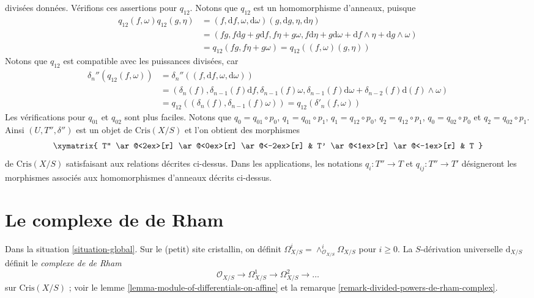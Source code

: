 \begin{remark}
divisées données. Vérifions ces assertions pour $q_{12}$. Notons
que $q_{12}$ est un homomorphisme d'anneaux, puisque
\begin{align*}
q_{12}(f, \omega)q_{12}(g, \eta) & =
(f, \text{d}f, \omega, \text{d}\omega)(g, \text{d}g, \eta, \text{d}\eta) \\
& =
(fg, f\text{d}g + g \text{d}f, f\eta + g\omega,
f\text{d}\eta + g\text{d}\omega + \text{d}f \wedge \eta +
\text{d}g \wedge \omega) \\
& = q_{12}(fg, f\eta + g\omega) = q_{12}((f, \omega)(g, \eta))
\end{align*}
Notons que $q_{12}$ est compatible avec les puissances divisées, car
\begin{align*}
\delta_n''(q_{12}(f, \omega)) & =
\delta_n''((f, \text{d}f, \omega, \text{d}\omega)) \\
& =
(\delta_n(f), \delta_{n - 1}(f)\text{d}f, \delta_{n - 1}(f)\omega,
\delta_{n - 1}(f)\text{d}\omega + \delta_{n - 2}(f)\text{d}(f) \wedge \omega)
\\
& = q_{12}((\delta_n(f), \delta_{n - 1}(f)\omega)) =
q_{12}(\delta'_n(f, \omega))
\end{align*}
Les vérifications pour $q_{01}$ et $q_{02}$ sont plus faciles.
Notons que $q_0 = q_{01} \circ p_0$, $q_1 = q_{01} \circ p_1$,
$q_1 = q_{12} \circ p_0$, $q_2 = q_{12} \circ p_1$,
$q_0 = q_{02} \circ p_0$ et $q_2 = q_{02} \circ p_1$.
Ainsi $(U, T'', \delta'')$ est un objet de $\text{Cris}(X/S)$
et l'on obtient des morphismes
$$
\xymatrix{
T''
\ar@<2ex>[r]
\ar@<0ex>[r]
\ar@<-2ex>[r]
&
T'
\ar@<1ex>[r]
\ar@<-1ex>[r]
&
T
}
$$
de $\text{Cris}(X/S)$ satisfaisant aux relations décrites ci-dessus.
Dans les applications, les notations $q_i : T'' \to T$ et
$q_{ij} : T'' \to T'$ désigneront les morphismes associés aux
homomorphismes d'anneaux décrits ci-dessus.
\end{remark}






\section{Le complexe de de Rham}
\label{section-de-Rham}

\noindent
Dans la situation \ref{situation-global}.
Sur le (petit) site cristallin, on définit
$\Omega^i_{X/S} = \wedge^i_{\mathcal{O}_{X/S}} \Omega_{X/S}$
pour $i \geq 0$. La $S$-dérivation universelle $\text{d}_{X/S}$ définit
le {\it complexe de de Rham}
$$
\mathcal{O}_{X/S} \to \Omega^1_{X/S} \to \Omega^2_{X/S} \to \ldots
$$
sur $\text{Cris}(X/S)$ ; voir le
lemme \ref{lemma-module-of-differentials-on-affine} et la
remarque \ref{remark-divided-powers-de-rham-complex}.


